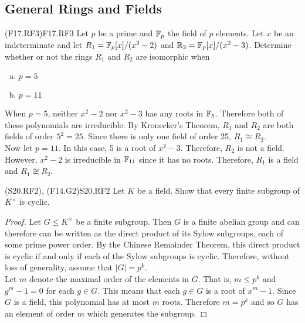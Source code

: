 \documentclass[../AlgebraQualSolutions.tex]{subfiles}
\begin{document}
\subsection{General Rings and Fields}

\begin{prob}{(F17.RF3)}{F17.RF3}
    Let $p$ be a prime and $\mathbb{F}_p$ the field of $p$ elements. Let $x$ be an indeterminate and let $R_1 = \mathbb{F}_p[x]/(x^2 - 2)$ and $\mathbb{R}_2 = \mathbb{F}_p[x]/(x^2 - 3)$. Determine whether or not the rings $R_1$ and $R_2$ are isomorphic when
    \begin{enumerate}[(a)]
        \item $p = 5$
        \item $p = 11$
    \end{enumerate}
\end{prob}


\begin{solution}
When $p = 5$, neither $x^2 - 2$ nor $x^2 - 3$ has any roots in $\mathbb{F}_5$. Therefore both of these polynomials are irreducible. By Kronecker's Theorem, $R_1$ and $R_2$ are both fields of order $5^2 = 25$. Since there is only one field of order 25, $R_1 \cong R_2$.\\

Now let $p = 11$. In this case, 5 is a root of $x^2 - 3$. Therefore, $R_2$ is not a field. However, $x^2 - 2$ is irreducible in $\mathbb{F}_{11}$ since it has no roots. Therefore, $R_1$ is a field and $R_1 \not\cong R_2$.
\end{solution}

\begin{prob}{(S20.RF2), (F14.G2)}{S20.RF2}
Let $K$ be a field. Show that every finite subgroup of $K^\times$ is cyclic.
\end{prob}

\begin{proof}
	Let $G \leq K^\times$ be a finite subgroup. Then $G$ is a finite abelian group and can therefore can be written as the direct product of its Sylow subgroups, each of some prime power order. By the Chinese Remainder Theorem, this direct product is cyclic if and only if each of the Sylow subgroups is cyclic. Therefore, without loss of generality, assume that $|G| = p^k$.\\

	Let $m$ denote the maximal order of the elements in $G$. That is, $m \leq p^k$ and $g^m - 1 = 0$ for each $g \in G$. This  means that each $g \in G$ is a root of $x^m - 1$. Since $G$ is a field, this polynomial has at most $m$ roots. Therefore $m = p^k$ and so $G$ has an element of order $m$ which generates the subgroup.
\end{proof}
\end{document}
